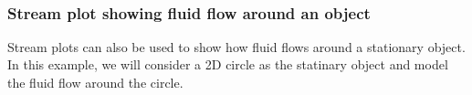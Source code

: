 \documentclass{book}
\begin{document}
    \begin{center}
    \end{center}
    { \hspace*{\fill} \\}
    

    
        \subsubsection{Stream plot showing fluid flow around an
object}\label{stream-plot-showing-fluid-flow-around-an-object}

Stream plots can also be used to show how fluid flows around a
stationary object. In this example, we will consider a 2D circle as the
statinary object and model the fluid flow around the circle.
    
\end{document}
